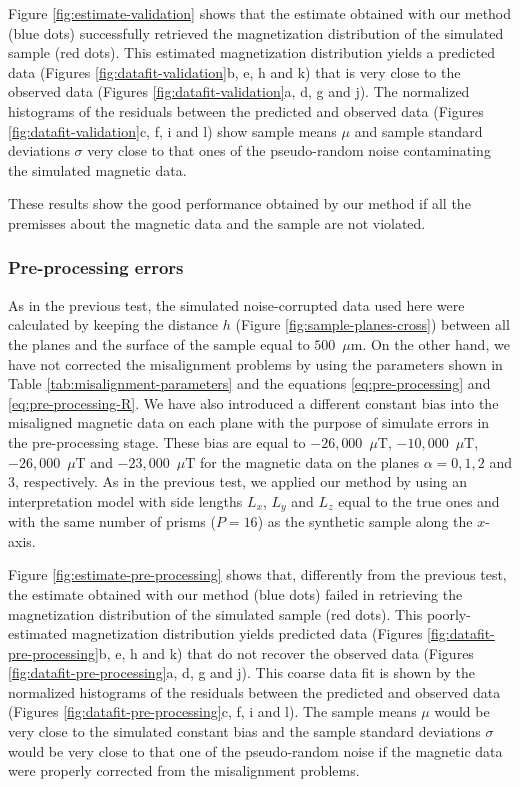 \documentclass[galley,gc]{agutex}
\begin{document}
\begin{article}
Figure \ref{fig:estimate-validation} shows that the estimate
obtained with our method (blue dots) successfully retrieved the 
magnetization distribution of the simulated sample (red dots).
This estimated magnetization distribution yields a predicted data
(Figures \ref{fig:datafit-validation}b, e, h and k) that is very
close to the observed data (Figures \ref{fig:datafit-validation}a, 
d, g and j).
The normalized histograms of the residuals between the predicted and
observed data (Figures \ref{fig:datafit-validation}c, f, i and l) show
sample means $\mu$ and sample standard deviations $\sigma$
very close to that ones of the pseudo-random noise 
contaminating the simulated magnetic data.

These results show the good performance obtained by our method
if all the premisses about the magnetic data and the sample 
are not violated.

\subsubsection{Pre-processing errors}

As in the previous test, the simulated noise-corrupted data 
used here were calculated by keeping the distance $h$ (Figure 
\ref{fig:sample-planes-cross}) between all the planes and the 
surface of the sample equal to $500$~$\mu$m.
On the other hand, we have not corrected the misalignment 
problems by using the parameters shown in 
Table \ref{tab:misalignment-parameters} and the equations 
\ref{eq:pre-processing} and \ref{eq:pre-processing-R}.
We have also introduced a different constant bias into the 
misaligned magnetic data on each plane with the purpose of
simulate errors in the pre-processing stage. These bias are
equal to $-26,000$~$\mu$T, $-10,000$~$\mu$T, $-26,000$~$\mu$T
and $-23,000$~$\mu$T for the magnetic data on the planes
$\alpha = 0, 1, 2$ and $3$, respectively.
As in the previous test, we applied our method by using
an interpretation model with side lengths $L_{x}$, $L_{y}$ 
and $L_{z}$ equal to the true ones and with the same number 
of prisms ($P = 16$) as the synthetic sample along the $x$-axis.

Figure \ref{fig:estimate-pre-processing} shows that,
differently from the previous test, 
the estimate obtained with our method (blue dots) failed in
retrieving the magnetization distribution of the simulated sample
(red dots).
This poorly-estimated magnetization distribution yields 
predicted data (Figures \ref{fig:datafit-pre-processing}b, e, h and k) 
that do not
recover the observed data (Figures \ref{fig:datafit-pre-processing}a, 
d, g and j).
This coarse data fit is shown by the normalized histograms of 
the residuals between the predicted and
observed data (Figures \ref{fig:datafit-pre-processing}c, f, i and l).
The sample means $\mu$ would be very close to the simulated 
constant bias and the sample standard deviations $\sigma$ would
be very close to that one of the pseudo-random noise 
if the magnetic data were properly corrected from
the misalignment problems.


\end{article}
\end{document}
